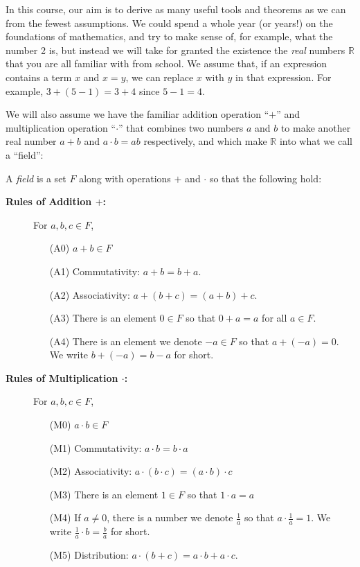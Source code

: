 \documentclass[11pt,dvipsnames]{book}
\numberwithin{figure}{section} %
\numberwithin{table}{section} %
\begin{document}
In this course, our aim is to derive as many useful tools and theorems as we can from the fewest assumptions. We could spend a whole year (or years!) on the foundations of mathematics, and try to make sense of, for example, what the number 2 is, but instead we will take for granted the existence the {\it real} numbers $\mathbb{R}$ that you are all familiar with from school. We assume that, if an expression contains a term $x$ and $x=y$, we can replace $x$ with $y$ in that expression.  For example, $3+(5-1)=3+4$ since $5-1=4$. 

We will also assume we have the familiar addition operation ``$+$'' and multiplication operation ``$\cdot$''  that combines two numbers $a$ and $b$ to make another real number $a+b$ and $a\cdot b=ab$ respectively, and which make $\mathbb{R}$ into what we call a ``field'': 

\begin{definition}
A {\it field} is a set $F$ along with operations $+$ and $\cdot$ so that the following hold:\\

\begin{description}
\item[{\bf Rules of Addition $+$:}] For $a,b,c\in F$,
\begin{itemize}%
\item[(A0)] $a+b\in F$
\item[(A1)] Commutativity: $a+b=b+a$.
\item[(A2)] Associativity: $a+(b+c)=(a+b)+c$.
\item[(A3)] There is an element $0\in F$ so that $0+a=a$ for all $a\in F$.
\item[(A4)] There is an element we denote $-a\in F $ so that $a+(-a)=0$. We write $b+(-a)=b-a$ for short.
\end{itemize}
\end{description}



\begin{description}
\item[{\bf Rules of Multiplication $\cdot$:}] For $a,b,c\in F$,
\begin{itemize}%
\item[(M0)] $a\cdot b\in F$
\item[(M1)] Commutativity: $a\cdot b=b\cdot a$
\item[(M2)] Associativity: $a\cdot (b\cdot c)=(a\cdot b)\cdot c$
\item[(M3)] There is an element $1\in F$ so that $1\cdot a=a$ 
\item[(M4)] If $a\neq 0$, there is a number we denote $\frac{1}{a}$ so that $a\cdot\frac{1}{a}=1$. We write $\frac{1}{a}\cdot b=\frac{b}{a}$ for short.
\item[(M5)] Distribution: $a\cdot (b+c)=a\cdot b+a\cdot c$.
\end{itemize}
\end{description}
\end{definition}
\end{document}
